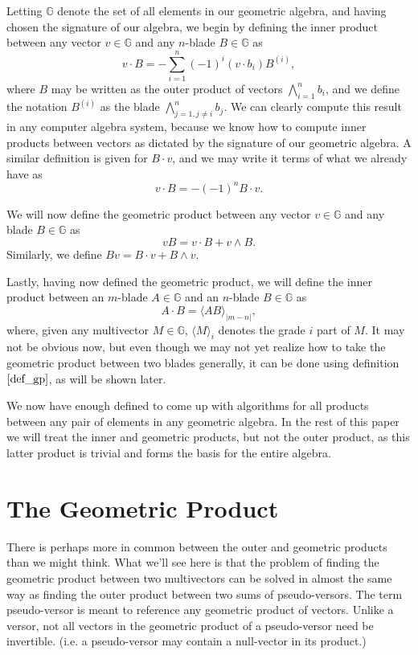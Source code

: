 \documentclass{article}
\newcommand{\G}{\mathbb{G}}
\begin{document}
Letting $\G$ denote the set of all elements in our geometric algebra,
and having chosen the signature of our algebra, we begin by defining the inner product
between any vector $v\in\G$ and any $n$-blade $B\in\G$ as
\begin{equation}\label{def_ip}
v\cdot B = -\sum_{i=1}^n(-1)^i(v\cdot b_i)B^{(i)},
\end{equation}
where $B$ may be written as the outer product of vectors $\bigwedge_{i=1}^n b_i$,
and we define the notation $B^{(i)}$ as the blade $\bigwedge_{j=1,j\neq i}^n b_j$.
We can clearly compute this result in any computer algebra system, because we
know how to compute inner products between vectors as dictated by the signature
of our geometric algebra.  A similar definition is given for $B\cdot v$, and we
may write it terms of what we already have as
\begin{equation*}
v\cdot B = -(-1)^n B\cdot v.
\end{equation*}

We will now define the geometric product between any vector $v\in\G$
and any blade $B\in\G$ as
\begin{equation}\label{def_gp}
vB = v\cdot B + v\wedge B.
\end{equation}
Similarly, we define $Bv = B\cdot v + B\wedge v$.

Lastly, having now defined the geometric product, we will define the
inner product between an $m$-blade $A\in\G$ and an $n$-blade $B\in\G$ as
\begin{equation}\label{def_ip_blades}
A\cdot B = \langle AB\rangle_{|m-n|},
\end{equation}
where, given any multivector $M\in\G$, $\langle M\rangle_i$ denotes the
grade $i$ part of $M$.  It may not be obvious now, but even though we may not
yet realize how to take the geometric product between two blades generally, it can
be done using definition $\eqref{def_gp}$, as will be shown later.

We now have enough defined to come up with
algorithms for all products between any pair of elements in any geometric algebra.
In the rest of this paper we will treat the inner and geometric products, but
not the outer product, as this latter product is trivial and forms the basis
for the entire algebra.

\section*{The Geometric Product}

There is perhaps more in common between the outer and geometric products
than we might think.  What we'll see here is that the problem of finding the geometric
product between two multivectors can be solved in almost the same way as finding
the outer product between two sums of pseudo-versors.  The term pseudo-versor
is meant to reference any geometric product of vectors.  Unlike a versor, not all
vectors in the geometric product of a pseudo-versor need be invertible.  (i.e. a pseudo-versor may
contain a null-vector in its product.)
\end{document}
